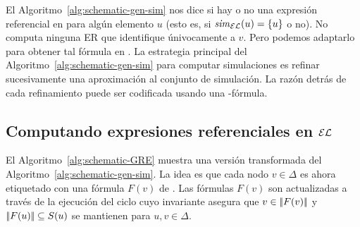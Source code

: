 El Algoritmo~\ref{alg:schematic-gen-sim} nos dice si hay o no una expresi\'on referencial en \EL para alg\'un elemento $u$ (esto es, si
${\it sim}_{\mathcal{EL}}(u) = \{u\}$ o no). No computa ninguna ER que identifique \'univocamente a $v$. Pero
podemos adaptarlo para obtener tal f\'ormula en \EL.
La estrategia principal del Algoritmo~\ref{alg:schematic-gen-sim} para computar simulaciones es refinar sucesivamente una aproximaci\'on al conjunto de simulaci\'on.
La raz\'on detr\'as de cada refinamiento puede ser codificada usando una \EL-f\'ormula.

\subsection{Computando expresiones referenciales en $\mathcal{EL}$}
\label{sec:computandoEnEL}

El Algoritmo~\ref{alg:schematic-GRE} muestra una versi\'on transformada del 
Algoritmo~\ref{alg:schematic-gen-sim}. La idea es que cada nodo
$v\in\Delta$ es ahora etiquetado con una f\'ormula
$F(v)$ de \EL. Las f\'ormulas $F(v)$ son actualizadas a trav\'es de la ejecuci\'on del ciclo cuyo invariante asegura que $v \in
|\!|F(v)|\!|$ y $|\!|F(u)|\!| \subseteq S(u)$ se mantienen para
$u,v\in\Delta$.\\

%
%
%
%



